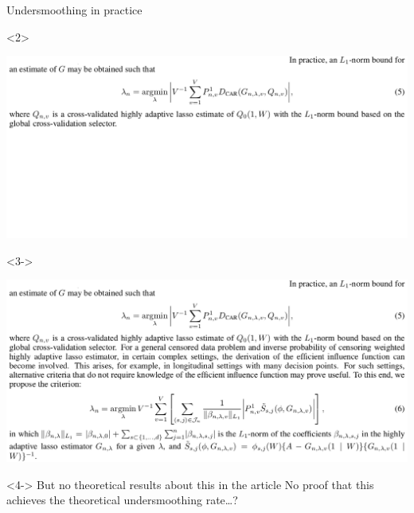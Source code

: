 \documentclass[smaller]{beamer}\usepackage{listings}
\begin{document}
\begin{frame}[label={sec:org8d94d84}]{Undersmoothing in practice}
\pause

\begin{onlyenv}<2>
\begin{center}
\includegraphics[width=1.02\textwidth]{./screenshots/undersmoothing-practice0.png}
\end{center}
\end{onlyenv}

\begin{onlyenv}<3->
\begin{center}
\includegraphics[width=1.02\textwidth]{./screenshots/undersmoothing-practice1.png}
\end{center}
\end{onlyenv}

\begin{block}<4->{\color{red} But no theoretical results about this in the article}
No proof that this achieves the theoretical undersmoothing rate\ldots{}?
\end{block}
\end{frame}
\end{document}
